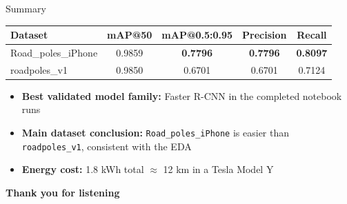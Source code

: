\documentclass[aspectratio=169]{beamer}
\begin{document}
\begin{frame}{Summary}
  \begin{table}
    \centering
    \renewcommand{\arraystretch}{1.4}
    \begin{tabular}{lcccc}
      \toprule
      \textbf{Dataset} & \textbf{mAP@50} & \textbf{mAP@0.5:0.95} & \textbf{Precision} & \textbf{Recall} \\
      \midrule
      Road\_poles\_iPhone & 0.9859 & \textbf{0.7796} & \textbf{0.7796} & \textbf{0.8097} \\
      roadpoles\_v1      & 0.9850 & 0.6701 & 0.6701 & 0.7124  \\
      \bottomrule
    \end{tabular}
  \end{table}
  \vspace{1em}
  \begin{itemize}
    \item \textbf{Best validated model family:} Faster R-CNN in the completed notebook runs
    \item \textbf{Main dataset conclusion:} \texttt{Road\_poles\_iPhone} is easier than \texttt{roadpoles\_v1}, consistent with the EDA
    \item \textbf{Energy cost:} 1.8 kWh total $\approx$ 12 km in a Tesla Model Y
  \end{itemize}
\end{frame}

\begin{frame}[plain]
  \vspace*{0.32\paperheight}
  \begin{center}
    {\color{ntnu}\Huge \textbf{Thank you for listening}}
  \end{center}
\end{frame}
\end{document}
